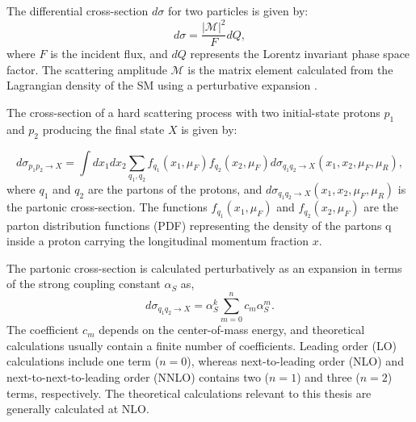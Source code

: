 The differential cross-section $d\sigma$ for two particles is given by:
\begin{equation}
d\sigma  = \frac{{|\mathcal{M}|}^2}{F} dQ,
\label{eqn:DiffxS}
\end{equation}
where $F$ is the incident flux, and $dQ$ represents the Lorentz invariant phase space factor. The scattering amplitude $\mathcal{M}$ is the matrix element calculated from the Lagrangian density of the SM using a perturbative expansion \cite{QCDForCollider}.

The cross-section of a hard scattering process with two initial-state protons $p_{1}$ and $p_{2}$ producing the final state $X$ is given by:

\begin{equation}
d\sigma_{p_{1}p_{2} \rightarrow X } = \int dx_{1} dx_{2} \sum_{q_{1},q_{2}} f_{q_{1}}(x_{1},\mu_{F})f_{q_{2}}(x_{2},\mu_{F}) d\sigma_{q_{1}q_{2}\rightarrow X } (x_{1},x_{2},\mu_{F},\mu_{R}),
\label{eqn:DifferentialPartonicXS}
\end{equation}
where $q_{1}$ and $q_{2}$ are the partons of the protons, and $d\sigma_{q_{1}q_{2}\rightarrow X } (x_{1},x_{2},\mu_{F},\mu_{R})$ is the partonic cross-section. The functions $f_{q_{1}}(x_{1},\mu_{F})$ and $f_{q_{2}}(x_{2},\mu_{F})$ are the parton distribution functions (PDF) representing the density of the partons q inside a proton carrying the longitudinal momentum fraction $x$.

The partonic cross-section is calculated perturbatively as an expansion in terms of the strong coupling constant $\alpha_{S}$ as,
\begin{equation}
\label{eqn:PartonicXS}
d\sigma_{q_{1}q_{2}\rightarrow X} = \alpha_{S}^{k} \sum_{m=0}^{n} c_{m}\alpha_{S}^{m}.
\end{equation}
The coefficient $c_{m}$ depends on the center-of-mass energy, and theoretical calculations usually contain a finite number of coefficients. Leading order (LO) calculations include one term ($n=0$), whereas next-to-leading order (NLO) and next-to-next-to-leading order (NNLO) contains two ($n=1$) and three ($n=2$) terms, respectively. The theoretical calculations relevant to this thesis are generally calculated at NLO. 

